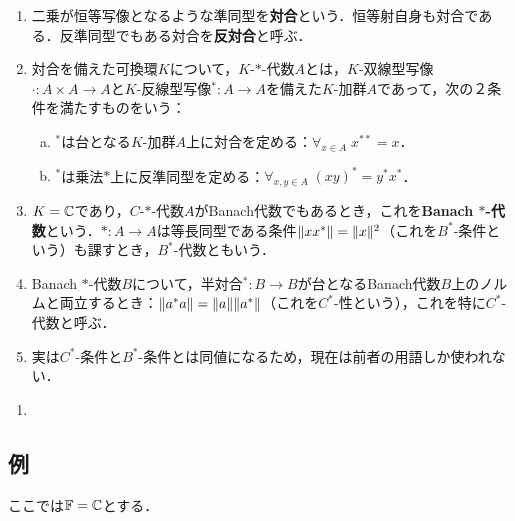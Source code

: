 \documentclass[uplatex,dvipdfmx]{jsreport}
\begin{document}
\begin{definition}\mbox{}
    \begin{enumerate}
        \item 二乗が恒等写像となるような準同型を\textbf{対合}という．恒等射自身も対合である．反準同型でもある対合を\textbf{反対合}と呼ぶ．
        \item 対合を備えた可換環$K$について，$K$-$*$-代数$A$とは，$K$-双線型写像$\cdot:A\times A\to A$と$K$-反線型写像${}^*:A\to A$を備えた$K$-加群$A$であって，次の２条件を満たすものをいう：
        \begin{enumerate}[(a)]
            \item ${}^*$は台となる$K$-加群$A$上に対合を定める：$\forall_{x\in A}\;x^{**}=x$．
            \item ${}^*$は乗法$*$上に反準同型を定める：$\forall_{x,y\in A}\;(xy)^*=y^*x^*$．
        \end{enumerate}
        \item $K=\mathbb{C}$であり，$C$-$*$-代数$A$がBanach代数でもあるとき，これを\textbf{Banach $*$-代数}という．$*:A\to A$は等長同型である条件$\|xx^*\|=\|x\|^2$（これを$B^*$-条件という）も課すとき，$B^*$-代数ともいう．
        \item Banach $*$-代数$B$について，半対合${}^*:B\to B$が台となるBanach代数$B$上のノルムと両立するとき：$\|a^*a\|=\|a\|\|a^*\|$（これを$C^*$-性という），これを特に$C^*$-代数と呼ぶ．
        \item 実は$C^*$-条件と$B^*$-条件とは同値になるため，現在は前者の用語しか使われない．
    \end{enumerate}
\end{definition}

\begin{example}\mbox{}
    \begin{enumerate}
        \item 
    \end{enumerate}
\end{example}

\subsection{例}

\begin{tcolorbox}[colframe=ForestGreen, colback=ForestGreen!10!white,breakable,colbacktitle=ForestGreen!40!white,coltitle=black,fonttitle=\bfseries\sffamily,
title=]
    ここでは$\mathbb{F}=\mathbb{C}$とする．
\end{tcolorbox}
\end{document}
